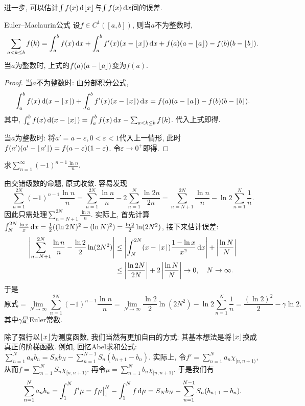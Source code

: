 进一步, 可以估计$\int f(x) \mathop{}\!\mathrm{d} \lfloor x \rfloor$与$\int f(x) \mathop{}\!\mathrm{d} x$间的误差. 

\begin{proposition}{Euler–Maclaurin公式}
	设$f \in C^1([a,b])$, 则当$a$不为整数时, $$\sum_{a<k \leq b} f(k) = \int_a^b f(x) \mathop{}\!\mathrm{d} x + \int_a^b f'(x)(x-\lfloor x \rfloor) \mathop{}\!\mathrm{d} x + f(a)(a-\lfloor a \rfloor)-f(b)(b-\lfloor b \rfloor).$$
	当$a$为整数时, 上式的$f(a)(a-\lfloor a \rfloor)$变为$f(a)$. 
\end{proposition}
\begin{proof}
	当$a$不为整数时: 由分部积分公式, $$\int_a^b f(x) \mathop{}\!\mathrm{d} (x-\lfloor x \rfloor) + \int_a^b f'(x)(x-\lfloor x \rfloor) \mathop{}\!\mathrm{d} x = f(a)(a-\lfloor a \rfloor)-f(b)(b-\lfloor b \rfloor).$$
	其中, $\int_a^b f(x) \mathop{}\!\mathrm{d} (x-\lfloor x \rfloor) = \int_a^b f(x) \mathop{}\!\mathrm{d} x - \sum_{a<k \leq b}f(k)$. 代入上式即得. 
	
	当$a$为整数时: 将$a'=a-\varepsilon ,0<\varepsilon <1$代入上一情形, 此时$f(a')(a'-\lfloor a' \rfloor) = f(a-\varepsilon)(1-\varepsilon)$. 令$\varepsilon \to 0^+$即得. 
\end{proof}

\begin{example}
	求$\displaystyle \sum_{n=1}^{\infty} (-1)^{n-1} \frac{\ln n}{n}$. 
\end{example}
\begin{solution}
	由交错级数的命题, 原式收敛. 容易发现$$\sum_{n=1}^{2N} (-1)^{n-1} \frac{\ln n}{n} = \sum_{n=1}^{2N} \frac{\ln n}{n} - 2\sum_{n=1}^{N} \frac{\ln 2n}{2n} = \sum_{n=N+1}^{2N} \frac{\ln n}{n} - \ln 2 \sum_{n=1}^{N} \frac{1}{n} .$$
	因此只需处理$\sum_{n=N+1}^{2N} \frac{\ln n}{n}$. 实际上, 首先计算$\int_N^{2N} \frac{\ln x}{x} \mathop{}\!\mathrm{d} x = \frac{1}{2}((\ln 2N)^2-(\ln N)^2) = \frac{\ln 2}{2}\ln (2N^2) $, 接下来估计误差: 
	\begin{align*}
		\left| \sum_{n=N+1}^{2N} \frac{\ln n}{n} - \frac{\ln 2}{2}\ln (2N^2) \right| &\leq \left| \int_{N}^{2N} (x-\lfloor x \rfloor) \frac{1-\ln x}{x^2} \mathop{}\!\mathrm{d} x \right| + \left| \frac{\ln N}{N} \right| \\
		&\leq \left| \frac{\ln 2N}{2N} \right| + 2\left| \frac{\ln N}{N} \right| \to 0,\quad N \to \infty .
	\end{align*}
	于是$$\textit{原式} = \lim_{N \to \infty} \sum_{n=1}^{2N} (-1)^{n-1} \frac{\ln n}{n} = \lim_{N \to \infty} \frac{\ln 2}{2}\ln (2N^2) - \ln 2\sum_{n=1}^{N} \frac{1}{n} = \frac{(\ln 2)^2}{2} - \gamma \ln 2.$$
	其中$\gamma$是Euler常数. 
\end{solution}

除了强行以$\lfloor x \rfloor$为测度函数, 我们当然有更加自由的方式: 其基本想法是将$\lfloor x \rfloor$换成真正的阶梯函数. 例如, 回忆Abel求和公式: $\sum_{n=1}^{N} a_nb_n = S_Nb_N - \sum_{n=1}^{N-1} S_n(b_{n+1}-b_n)$. 实际上, 令$f' = \sum_{n=1}^{N} a_n \chi_{[n,n+1 )}$, 从而$f = \sum_{n=1}^{N} S_n\chi_{[n,n+1 )}$. 再令$\mu = \sum_{n=1}^{N} b_n \chi_{[n,n+1 )}$. 于是我们有$$\sum_{n=1}^{N} a_nb_n = \int_1^N f' \mu = f\mu \big|_1^N - \int_1^N f \mathop{}\!\mathrm{d} \mu = S_Nb_N - \sum_{n=1}^{N-1} S_n(b_{n+1}-b_n). $$

